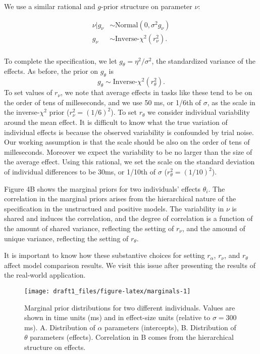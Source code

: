 \documentclass[american,man]{apa6}
\begin{document}
We use a similar rational and \(g\)-prior structure on parameter
\(\nu\):

\begin{align*}
\nu|g_{\nu} &\sim \mbox{Normal}(0,\sigma^2g_{\nu})\\
g_{\nu} &\sim \mbox{Inverse-$\chi^2$}(r^2_{\nu}).\\
\end{align*}

To complete the specification, we let \(g_\theta = \eta^2/\sigma^2\),
the standardized variance of the effects. As before, the prior on
\(g_\theta\) is \[
g_\theta \sim \mbox{Inverse-$\chi^2$}(r^2_{\theta}).
\] To set values of \(r_\nu\), we note that average effects in tasks
like these tend to be on the order of tens of milleseconds, and we use
50 ms, or 1/6th of \(\sigma\), as the scale in the inverse-\(\chi^2\)
prior (\(r^2_\nu = (1/6)^2\)). To set \(r_\theta\) we consider
individual variability around the mean effect. It is difficult to know
what the true variation of individual effects is because the observed
variability is confounded by trial noise. Our working assumption is that
the scale should be also on the order of tens of milleseconds. Moreover
we expect the variability to be no larger than the size of the average
effect. Using this rational, we set the scale on the standard deviation
of individual differences to be 30ms, or 1/10th of \(\sigma\)
(\(r^2_\theta = (1/10)^2\)).

Figure 4B shows the marginal priors for two individuals' effects
\(\theta_i\). The correlation in the marginal priors arises from the
hierarchical nature of the specification in the unstructued and positive
models. The variability in \(\nu\) is shared and induces the
correlation, and the degree of correlation is a function of the amount
of shared variance, reflecting the setting of \(r_\nu\), and the amound
of unique variance, reflecting the setting of \(r_\theta\).

It is important to know how these substantive choices for setting
\(r_\alpha\), \(r_\nu\), and \(r_\theta\) affect model comparison
results. We visit this issue after presenting the results of the
real-world application.

\begin{figure}

{\centering \texttt{[image: draft1\_files/figure-latex/marginals-1]} 

}

\caption{Marginal prior distributions for two different individuals. Values are shown in time units (ms) and in effect-size units (relative to $\sigma = 300$ ms). A. Distribution of $\alpha$ parameters (intercepts), B. Distribution of $\theta$ parameters (effects). Correlation in B comes from the hierarchical structure on effects.}\label{fig:marginals}
\end{figure}
\end{document}
